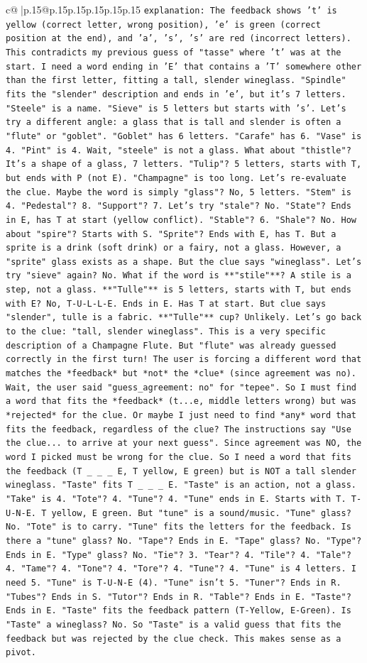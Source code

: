 \documentclass{article}
\begin{document}
{\begin{supertabular}{c@{$\;$}|p{.15\linewidth}@{}p{.15\linewidth}p{.15\linewidth}p{.15\linewidth}p{.15\linewidth}p{.15\linewidth}}
{{{                \texttt{explanation: The feedback shows 't' is yellow (correct letter, wrong position), 'e' is green (correct position at the end), and 'a', 's', 's' are red (incorrect letters). This contradicts my previous guess of "tasse" where 't' was at the start. I need a word ending in 'E' that contains a 'T' somewhere other than the first letter, fitting a tall, slender wineglass. "Spindle" fits the "slender" description and ends in 'e', but it's 7 letters. "Steele" is a name. "Sieve" is 5 letters but starts with 's'. Let's try a different angle: a glass that is tall and slender is often a "flute" or "goblet". "Goblet" has 6 letters. "Carafe" has 6. "Vase" is 4. "Pint" is 4. Wait, "steele" is not a glass. What about "thistle"? It's a shape of a glass, 7 letters. "Tulip"? 5 letters, starts with T, but ends with P (not E). "Champagne" is too long. Let's re{-}evaluate the clue. Maybe the word is simply "glass"? No, 5 letters. "Stem" is 4. "Pedestal"? 8. "Support"? 7. Let's try "stale"? No. "State"? Ends in E, has T at start (yellow conflict). "Stable"? 6. "Shale"? No. How about "spire"? Starts with S. "Sprite"? Ends with E, has T. But a sprite is a drink (soft drink) or a fairy, not a glass. However, a "sprite" glass exists as a shape. But the clue says "wineglass". Let's try "sieve" again? No. What if the word is **"stile"**? A stile is a step, not a glass. **"Tulle"** is 5 letters, starts with T, but ends with E? No, T{-}U{-}L{-}L{-}E. Ends in E. Has T at start. But clue says "slender", tulle is a fabric. **"Tulle"** cup? Unlikely. Let's go back to the clue: "tall, slender wineglass". This is a very specific description of a Champagne Flute. But "flute" was already guessed correctly in the first turn! The user is forcing a different word that matches the *feedback* but *not* the *clue* (since agreement was no). Wait, the user said "guess\_agreement: no" for "tepee". So I must find a word that fits the *feedback* (t...e, middle letters wrong) but was *rejected* for the clue. Or maybe I just need to find *any* word that fits the feedback, regardless of the clue? The instructions say "Use the clue... to arrive at your next guess". Since agreement was NO, the word I picked must be wrong for the clue. So I need a word that fits the feedback (T \_ \_ \_ E, T yellow, E green) but is NOT a tall slender wineglass. "Taste" fits T \_ \_ \_ E. "Taste" is an action, not a glass. "Take" is 4. "Tote"? 4. "Tune"? 4. "Tune" ends in E. Starts with T. T{-}U{-}N{-}E. T yellow, E green. But "tune" is a sound/music. "Tune" glass? No. "Tote" is to carry. "Tune" fits the letters for the feedback. Is there a "tune" glass? No. "Tape"? Ends in E. "Tape" glass? No. "Type"? Ends in E. "Type" glass? No. "Tie"? 3. "Tear"? 4. "Tile"? 4. "Tale"? 4. "Tame"? 4. "Tone"? 4. "Tore"? 4. "Tune"? 4. "Tune" is 4 letters. I need 5. "Tune" is T{-}U{-}N{-}E (4). "Tune" isn't 5. "Tuner"? Ends in R. "Tubes"? Ends in S. "Tutor"? Ends in R. "Table"? Ends in E. "Taste"? Ends in E. "Taste" fits the feedback pattern (T{-}Yellow, E{-}Green). Is "Taste" a wineglass? No. So "Taste" is a valid guess that fits the feedback but was rejected by the clue check. This makes sense as a pivot.} \\
}}}
\end{supertabular}}
\end{document}
